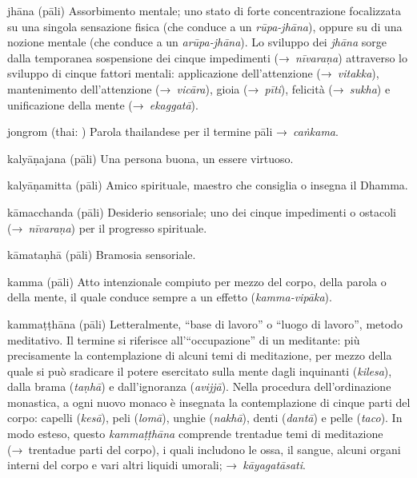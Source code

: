 \begin{glossarydescription}

\item[jhāna] (pāli) Assorbimento mentale; uno stato di forte concentrazione
  focalizzata su una singola sensazione fisica (che conduce a un
  \emph{rūpa-jhāna}), oppure su di una nozione mentale (che conduce a un
  \emph{arūpa-jhāna}). Lo sviluppo dei \emph{jhāna} sorge dalla temporanea
  sospensione dei cinque impedimenti (→~\emph{nīvaraṇa}) attraverso lo sviluppo
  di cinque fattori mentali: applicazione dell'attenzione (→~\emph{vitakka}),
  mantenimento dell'attenzione (→~\emph{vicāra}), gioia (→~\emph{pīti}),
  felicità (→~\emph{sukha}) e unificazione della mente (→~\emph{ekaggatā}).

\item[jongrom] (thai: ) Parola thailandese per il termine
  pāli →~\emph{caṅkama}.


\item[kalyāṇajana] (pāli) Una persona buona, un essere virtuoso.

\item[kalyāṇamitta] (pāli) Amico spirituale, maestro che consiglia o insegna il
  Dhamma.

\item[kāmacchanda] (pāli) Desiderio sensoriale; uno dei cinque impedimenti o
  ostacoli (→~\emph{nīvaraṇa}) per il progresso spirituale.

\item[kāmataṇhā] (pāli) Bramosia sensoriale.

\item[kamma] (pāli) Atto intenzionale compiuto per mezzo del corpo, della parola
  o della mente, il quale conduce sempre a un effetto (\emph{kamma-vipāka}).

\item[kammaṭṭhāna] (pāli) Letteralmente, ``base di lavoro'' o ``luogo di
  lavoro'', metodo meditativo. Il termine si riferisce all'``occupazione'' di un
  meditante: più precisamente la contemplazione di alcuni temi di meditazione,
  per mezzo della quale si può sradicare il potere esercitato sulla mente dagli
  inquinanti (\emph{kilesa}), dalla brama (\emph{taṇhā}) e dall'ignoranza
  (\emph{avijjā}). Nella procedura dell'ordinazione monastica, a ogni nuovo
  monaco è insegnata la contemplazione di cinque parti del corpo: capelli
  (\emph{kesā}), peli (\emph{lomā}), unghie (\emph{nakhā}), denti (\emph{dantā})
  e pelle (\emph{taco}). In modo esteso, questo \emph{kammaṭṭhāna} comprende
  trentadue temi di meditazione (→~trentadue parti del corpo), i quali includono
  le ossa, il sangue, alcuni organi interni del corpo e vari altri liquidi
  umorali; →~\emph{kāyagatāsati}.


\end{glossarydescription}
